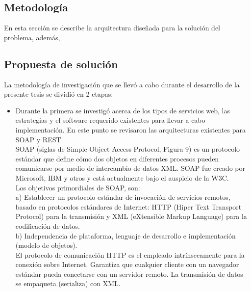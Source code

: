 \documentclass[12pt,letterpaper,titlepage]{article}
\begin{document}
\begin{itemize}
\newpage
\chapter{Metodología}\label{capIII}

En esta sección se describe la arquitectura diseñada para la solución del problema, además, 

\section{Propuesta de solución}\label{metodo}

La metodología de investigación que se llevó a cabo durante el desarrollo de la presente tesis se dividió en 2 etapas:

\begin{itemize}
\item Durante la primera se investigó acerca de los tipos de servicios web, las estrategias y el software requerido existentes para llevar a cabo implementación. En este punto se revisaron las arquitecturas existentes para SOAP y REST.\\

SOAP (siglas de Simple Object Access Protocol, Figura 9) es un protocolo estándar que define cómo dos objetos en diferentes procesos pueden comunicarse por medio de intercambio de datos XML. SOAP fue creado por Microsoft, IBM y otros y está actualmente bajo el auspicio de la W3C.\\


Los objetivos primordiales de SOAP, son:\\

a) Establecer un protocolo estándar de invocación de servicios remotos, basado en protocolos estándares de Internet: HTTP (Hiper Text Transport Protocol) para la transmisión y XML (eXtensible Markup Language) para la codificación de datos.\\

b) Independencia de plataforma, lenguaje de desarrollo e implementación (modelo de objetos).\\

El protocolo de comunicación HTTP es el empleado intrínsecamente para la conexión sobre Internet. Garantiza que cualquier cliente con un navegador estándar pueda conectarse con un servidor remoto. La transmisión de datos se empaqueta (serializa) con XML.\\


\end{itemize}
\end{itemize}
\end{document}
